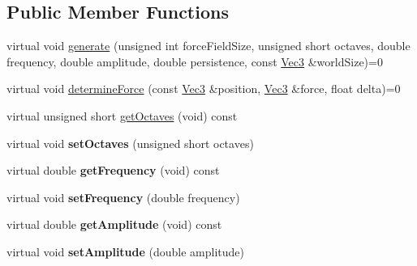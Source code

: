 \subsection*{Public Member Functions}
\begin{DoxyCompactItemize}
\item 
virtual void \hyperlink{classPUForceFieldCalculationFactory_a8292a8ec09320a66c6ef130e98a7fd90}{generate} (unsigned int force\+Field\+Size, unsigned short octaves, double frequency, double amplitude, double persistence, const \hyperlink{classVec3}{Vec3} \&world\+Size)=0
\item 
virtual void \hyperlink{classPUForceFieldCalculationFactory_ab2ec33f744eccdd1301aa9c12a3f54f9}{determine\+Force} (const \hyperlink{classVec3}{Vec3} \&position, \hyperlink{classVec3}{Vec3} \&force, float delta)=0
\item 
virtual unsigned short \hyperlink{classPUForceFieldCalculationFactory_a1c537b71a537b6e7450dac5ac5b9189b}{get\+Octaves} (void) const
\item 
\mbox{\label{classPUForceFieldCalculationFactory_a0f8ef861b54b0f95cc71db43d7198475}} 
virtual void {\bfseries set\+Octaves} (unsigned short octaves)
\item 
\mbox{\label{classPUForceFieldCalculationFactory_af0322f7fc12521f7ab2402a44d42480e}} 
virtual double {\bfseries get\+Frequency} (void) const
\item 
\mbox{\label{classPUForceFieldCalculationFactory_a0f7f200320f72835ef6e9b1d9a9c0068}} 
virtual void {\bfseries set\+Frequency} (double frequency)
\item 
\mbox{\label{classPUForceFieldCalculationFactory_aeb776c1339157588019fe8c6df82e8ce}} 
virtual double {\bfseries get\+Amplitude} (void) const
\item 
\mbox{\label{classPUForceFieldCalculationFactory_adb5f523b30927ef78f88eb00dbc70287}} 
virtual void {\bfseries set\+Amplitude} (double amplitude)
\item 
\mbox{\label{classPUForceFieldCalculationFactory_afa640c66e06d50990fc924cb0cba024e}} 

\end{DoxyCompactItemize}
